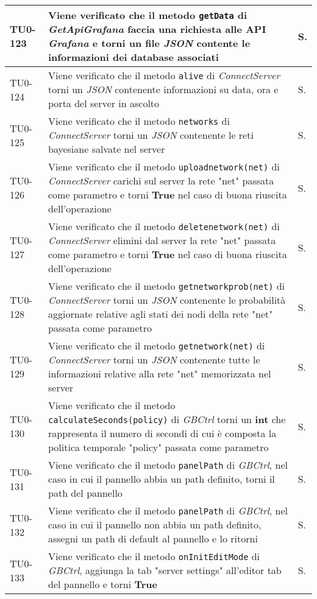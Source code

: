 \begin{longtable}{|C{.15\textwidth}|m{.66\textwidth}|C{.10\textwidth}|}
\hline
{}TU0-123 & Viene verificato che il metodo \texttt{getData} di \textit{GetApiGrafana} faccia una richiesta alle API \textit{Grafana} e torni un file \textit{JSON} contente le informazioni dei database associati & S.\\
\hline
TU0-124 & Viene verificato che il metodo \texttt{alive} di \textit{ConnectServer} torni un \textit{JSON} contenente informazioni su data, ora e porta del server in ascolto & S.\\
\hline
{}TU0-125 & Viene verificato che il metodo \texttt{networks} di \textit{ConnectServer} torni un \textit{JSON} contenente le reti bayesiane salvate nel server & S.\\
\hline
TU0-126 & Viene verificato che il metodo \texttt{uploadnetwork(net)} di \textit{ConnectServer} carichi sul server la rete "net" passata come parametro e torni \textbf{True} nel caso di buona riuscita dell'operazione & S.\\
\hline
{}TU0-127 & Viene verificato che il metodo \texttt{deletenetwork(net)} di \textit{ConnectServer} elimini dal server la rete "net" passata come parametro e torni \textbf{True} nel caso di buona riuscita dell'operazione & S.\\
\hline
TU0-128 & Viene verificato che il metodo \texttt{getnetworkprob(net)} di \textit{ConnectServer} torni un \textit{JSON} contenente le probabilità aggiornate relative agli stati dei nodi della rete "net" passata come parametro & S.\\
\hline
{}TU0-129 & Viene verificato che il metodo \texttt{getnetwork(net)} di \textit{ConnectServer} torni un \textit{JSON} contenente tutte le informazioni relative alla rete "net" memorizzata nel server & S.\\
\hline
TU0-130 & Viene verificato che il metodo \texttt{calculateSeconds(policy)} di \textit{GBCtrl} torni un \textbf{int} che rappresenta il numero di secondi di cui è composta la politica temporale "policy" passata come parametro & S.\\
\hline
{}TU0-131 & Viene verificato che il metodo \texttt{panelPath} di \textit{GBCtrl}, nel caso in cui il pannello abbia un path definito, torni il path del pannello & S.\\
\hline
TU0-132 & Viene verificato che il metodo \texttt{panelPath} di \textit{GBCtrl}, nel caso in cui il pannello non abbia un path definito, assegni un path di default al pannello e lo ritorni & S.\\
\hline
{}TU0-133 & Viene verificato che il metodo \texttt{onInitEditMode} di \textit{GBCtrl}, aggiunga la tab "server settings" all'editor tab del pannello e torni \textbf{True} & S.\\

\end{longtable}
